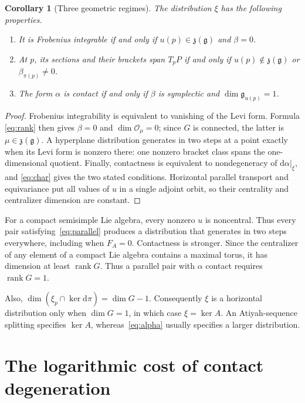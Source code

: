 \documentclass[11pt,a4paper]{article}
\numberwithin{equation}{section}
\newtheorem{corollary}[theorem]{Corollary}
\theoremstyle{definition}
\theoremstyle{remark}
\newcommand{\g}{\mathfrak g}
\newcommand{\z}{\mathfrak z}
\newcommand{\D}{\xi}
\newcommand{\rank}{\operatorname{rank}}
\newcommand{\dd}{\mathrm d}
\begin{document}
\begin{corollary}[Three geometric regimes]\label{cor:regimes}
The distribution $\D$ has the following properties.
\begin{enumerate}
\item It is Frobenius integrable if and only if $u(p)\in\z(\g)$ and
      $\beta=0$.
\item At $p$, its sections and their brackets span $T_pP$ if and only if
      $u(p)\notin\z(\g)$ or $\beta_{\pi(p)}\ne0$.
\item The form $\alpha$ is contact if and only if $\beta$ is symplectic and
      $\dim\g_{u(p)}=1$.
\end{enumerate}
\end{corollary}

\begin{proof}
Frobenius integrability is equivalent to vanishing of the Levi form. Formula
\eqref{eq:rank} then gives $\beta=0$ and $\dim\mathcal O_\mu=0$; since $G$
is connected, the latter is $\mu\in\z(\g)$. A hyperplane distribution
generates in two steps at a point exactly when its Levi form is nonzero there:
one nonzero bracket class spans the one-dimensional quotient. Finally,
contactness is equivalent to nondegeneracy of $\dd\alpha|_\D$, and
\eqref{eq:char} gives the two stated conditions. Horizontal parallel transport
and equivariance put all values of $u$ in a single adjoint orbit, so their
centrality and centralizer dimension are constant.
\end{proof}

For a compact semisimple Lie algebra, every nonzero $u$ is noncentral.
Thus every pair satisfying~\eqref{eq:parallel} produces a distribution that
generates in two steps everywhere, including when $F_A=0$.
Contactness is stronger. Since the centralizer of any element of a compact
Lie algebra contains a maximal torus, it has dimension at least $\rank G$.
Thus a parallel pair with $\alpha$ contact requires $\rank G=1$.

Also, $\dim(\D_p\cap\ker\dd\pi)=\dim G-1$. Consequently $\D$ is a
horizontal distribution only when $\dim G=1$, in which case $\D=\ker A$.
An Atiyah-sequence splitting specifies $\ker A$, whereas~\eqref{eq:alpha}
usually specifies a larger distribution.

\section{The logarithmic cost of contact degeneration}\label{sec:critical}
\end{document}
